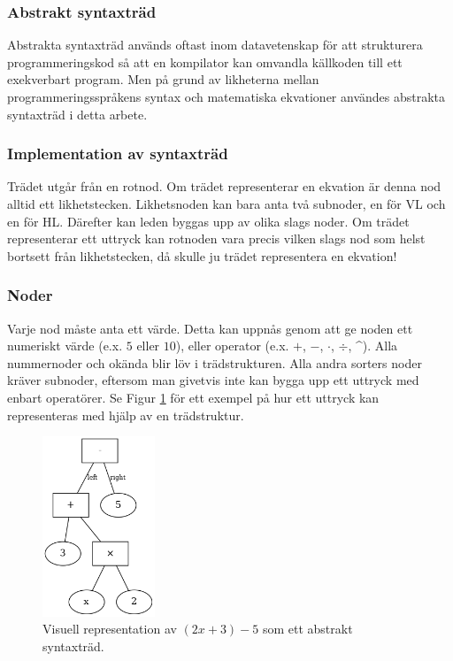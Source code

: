 \documentclass[12pt,a4paper]{article}
\begin{document}
\subsubsection{Abstrakt syntaxträd}
Abstrakta syntaxträd används oftast inom datavetenskap för att strukturera programmeringskod så att en kompilator kan omvandla källkoden till ett exekverbart program. Men på grund av likheterna mellan programmeringsspråkens syntax och matematiska ekvationer användes abstrakta syntaxträd i detta arbete.
\subsubsection{Implementation av syntaxträd}
Trädet utgår från en rotnod. Om trädet representerar en ekvation är denna nod alltid ett likhetstecken. Likhetsnoden kan bara anta två subnoder, en för VL och en för HL. Därefter kan leden byggas upp av olika slags noder. Om trädet representerar ett uttryck kan rotnoden vara precis vilken slags nod som helst bortsett från likhetstecken, då skulle ju trädet representera en ekvation!
\subsubsection{Noder}
\label{subsubsec:noder}
Varje nod måste anta ett värde. Detta kan uppnås genom att ge noden ett numeriskt värde (e.x. \(5\) eller \(10\)), eller operator (e.x. \(+\), \(-\), \(\cdot\), \(\div\), \string^). Alla nummernoder och okända blir löv i trädstrukturen. Alla andra sorters noder kräver subnoder, eftersom man givetvis inte kan bygga upp ett uttryck med enbart operatörer. Se Figur \ref{fig:2131} för ett exempel på hur ett uttryck kan representeras med hjälp av en trädstruktur.
\begin{figure}[H]
  \centering
  \includegraphics[width=0.3\textwidth]{image24}
  \caption{Visuell representation av \((2x + 3) - 5\) som ett abstrakt syntaxträd.}
  \label{fig:2131}
\end{figure}
\end{document}
